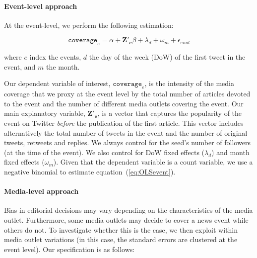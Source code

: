 \paragraph{Event-level approach}

At the event-level, we perform the following estimation:

\begin{equation}
\mathtt{coverage}_{e}= \alpha + \mathbf{Z'_{e}}\beta + \lambda_d + \omega_m + \epsilon_{emd}
\label{eq:OLSevent}
\end{equation}

\noindent  where $e$ index the events, $d$ the day of the week (DoW) of the first tweet in the event, and $m$ the month.

Our dependent variable of interest, $\mathtt{coverage}_{e}$, is the intensity of the media coverage that we proxy at the event level by the total number of articles devoted to the event and the number of different media outlets covering the event. Our main explanatory variable, $\mathbf{Z'_{e}}$, is a  vector that captures the popularity of the event on Twitter \textit{before} the publication of the first article. This vector includes alternatively the total number of tweets in the event and the number of original tweets, retweets and replies. We always control for the seed's number of followers (at the time of the event). We also control for DoW fixed effects ($\lambda_d$) and month fixed effects ($\omega_m$). Given that the dependent variable is a count variable, we use a negative binomial to estimate equation~(\ref{eq:OLSevent}).


\paragraph{Media-level approach}

Bias in editorial decisions may vary depending on the characteristics of the media outlet. Furthermore, some media outlets may decide to cover a news event while others do not. To investigate whether this is the case, we then exploit within media outlet variations (in this case, the standard errors are clustered at the event level). Our specification is as follows: 

